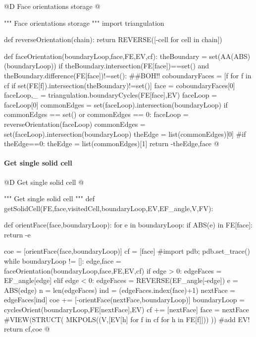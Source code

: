 \documentclass[11pt,oneside]{article}    %
\begin{document}
@D Face orientations storage
@{""" Face orientations storage """
import triangulation

def reverseOrientation(chain):
    return REVERSE([-cell for cell in chain])

def faceOrientation(boundaryLoop,face,FE,EV,cf):
    theBoundary = set(AA(ABS)(boundaryLoop))
    if theBoundary.intersection(FE[face])==set() and theBoundary.difference(FE[face])!=set(): ##BOH!!
        coboundaryFaces = [f for f in cf if set(FE[f]).intersection(theBoundary)!=set()]
        face = coboundaryFaces[0]            
    faceLoop,_ = triangulation.boundaryCycles(FE[face],EV)
    faceLoop = faceLoop[0]
    commonEdges = set(faceLoop).intersection(boundaryLoop)
    if commonEdges == set() or commonEdges == {0}: 
        faceLoop = reverseOrientation(faceLoop)
        commonEdges = set(faceLoop).intersection(boundaryLoop)
    theEdge = list(commonEdges)[0]
    #if theEdge==0: theEdge = list(commonEdges)[1]
    return -theEdge,face
@}

\paragraph{Get single solid cell}

@D Get single solid cell
@{""" Get single solid cell """
def getSolidCell(FE,face,visitedCell,boundaryLoop,EV,EF_angle,V,FV):

    def orientFace(face,boundaryLoop): 
        for e in boundaryLoop:
            if ABS(e) in FE[face]: return -e

    coe = [orientFace(face,boundaryLoop)]
    cf = [face] 
    #import pdb; pdb.set_trace()
    while boundaryLoop != []:
        edge,face = faceOrientation(boundaryLoop,face,FE,EV,cf)
        if edge > 0: edgeFaces = EF_angle[edge]
        elif edge < 0: edgeFaces = REVERSE(EF_angle[-edge])
        e = ABS(edge)
        n = len(edgeFaces)
        ind = (edgeFaces.index(face)+1)%
        nextFace = edgeFaces[ind]
        coe += [-orientFace(nextFace,boundaryLoop)]
        boundaryLoop = cyclesOrient(boundaryLoop,FE[nextFace],EV)
        cf += [nextFace] 
        face = nextFace
        #VIEW(STRUCT( MKPOLS((V,[EV[h] for f in cf for h in FE[f]])) )) #add EV!
    return cf,coe
@}
\end{document}
